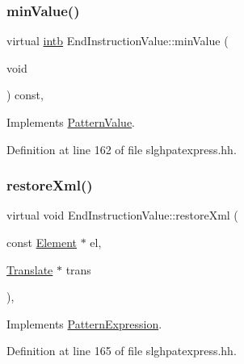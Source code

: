\subsubsection{\texorpdfstring{minValue()}{minValue()}}
{\footnotesize\ttfamily virtual \mbox{\hyperlink{types_8h_aa925ba3e627c2df89d5b1cfe84fb8572}{intb}} End\+Instruction\+Value\+::min\+Value (\begin{DoxyParamCaption}\item[{void}]{ }\end{DoxyParamCaption}) const\hspace{0.3cm}{\ttfamily [inline]}, {\ttfamily [virtual]}}



Implements \mbox{\hyperlink{class_pattern_value_a0dbf85240fe6310e36596fea3bb02f2e}{Pattern\+Value}}.



Definition at line 162 of file slghpatexpress.\+hh.

\mbox{\label{class_end_instruction_value_a6909b360cf6bdfc41fc1bc5d15bf9df3}} 
\subsubsection{\texorpdfstring{restoreXml()}{restoreXml()}}
{\footnotesize\ttfamily virtual void End\+Instruction\+Value\+::restore\+Xml (\begin{DoxyParamCaption}\item[{const \mbox{\hyperlink{class_element}{Element}} $\ast$}]{el,  }\item[{\mbox{\hyperlink{class_translate}{Translate}} $\ast$}]{trans }\end{DoxyParamCaption})\hspace{0.3cm}{\ttfamily [inline]}, {\ttfamily [virtual]}}



Implements \mbox{\hyperlink{class_pattern_expression_ad8986afdddbe7a8b64fdcf10478b5715}{Pattern\+Expression}}.



Definition at line 165 of file slghpatexpress.\+hh.

\mbox{\label{class_end_instruction_value_abdfcdbc8fd5dc96723bbc85ee3e9d24d}} 
